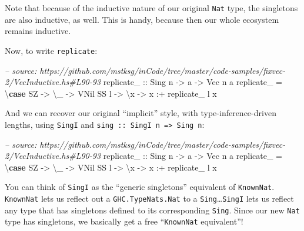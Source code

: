 \documentclass[]{article}
\newenvironment{Shaded}{}{}
\newcommand{\KeywordTok}[1]{\textcolor[rgb]{0.00,0.44,0.13}{\textbf{#1}}}
\newcommand{\DataTypeTok}[1]{\textcolor[rgb]{0.56,0.13,0.00}{#1}}
\newcommand{\CommentTok}[1]{\textcolor[rgb]{0.38,0.63,0.69}{\textit{#1}}}
\newcommand{\OtherTok}[1]{\textcolor[rgb]{0.00,0.44,0.13}{#1}}
\newcommand{\FunctionTok}[1]{\textcolor[rgb]{0.02,0.16,0.49}{#1}}
\newcommand{\NormalTok}[1]{#1}
\begin{document}
Note that because of the inductive nature of our original \texttt{Nat} type, the
singletons are also inductive, as well. This is handy, because then our whole
ecosystem remains inductive.

Now, to write \texttt{replicate}:

\begin{Shaded}
\begin{Highlighting}[]
\CommentTok{-- source: https://github.com/mstksg/inCode/tree/master/code-samples/fixvec-2/VecInductive.hs#L90-93}
\OtherTok{replicate_ ::} \DataTypeTok{Sing}\NormalTok{ n }\OtherTok{->}\NormalTok{ a }\OtherTok{->} \DataTypeTok{Vec}\NormalTok{ n a}
\NormalTok{replicate_ }\FunctionTok{=}\NormalTok{ \textbackslash{}}\KeywordTok{case}
    \DataTypeTok{SZ}   \OtherTok{->}\NormalTok{ \textbackslash{}_ }\OtherTok{->} \DataTypeTok{VNil}
    \DataTypeTok{SS}\NormalTok{ l }\OtherTok{->}\NormalTok{ \textbackslash{}x }\OtherTok{->}\NormalTok{ x }\FunctionTok{:+}\NormalTok{ replicate_ l x}
\end{Highlighting}
\end{Shaded}

And we can recover our original ``implicit'' style, with type-inference-driven
lengths, using \texttt{SingI} and
\texttt{sing\ ::\ SingI\ n\ =\textgreater{}\ Sing\ n}:

\begin{Shaded}
\begin{Highlighting}[]
\CommentTok{-- source: https://github.com/mstksg/inCode/tree/master/code-samples/fixvec-2/VecInductive.hs#L90-93}
\OtherTok{replicate_ ::} \DataTypeTok{Sing}\NormalTok{ n }\OtherTok{->}\NormalTok{ a }\OtherTok{->} \DataTypeTok{Vec}\NormalTok{ n a}
\NormalTok{replicate_ }\FunctionTok{=}\NormalTok{ \textbackslash{}}\KeywordTok{case}
    \DataTypeTok{SZ}   \OtherTok{->}\NormalTok{ \textbackslash{}_ }\OtherTok{->} \DataTypeTok{VNil}
    \DataTypeTok{SS}\NormalTok{ l }\OtherTok{->}\NormalTok{ \textbackslash{}x }\OtherTok{->}\NormalTok{ x }\FunctionTok{:+}\NormalTok{ replicate_ l x}
\end{Highlighting}
\end{Shaded}

You can think of \texttt{SingI} as the ``generic singletons'' equivalent of
\texttt{KnownNat}. \texttt{KnownNat} lets us reflect out a
\texttt{GHC.TypeNats.Nat} to a \texttt{Sing}\ldots{}\texttt{SingI} lets us
reflect any type that has singletons defined to its corresponding \texttt{Sing}.
Since our new \texttt{Nat} type has singletons, we basically get a free
``\texttt{KnownNat} equivalent''!
\end{document}
